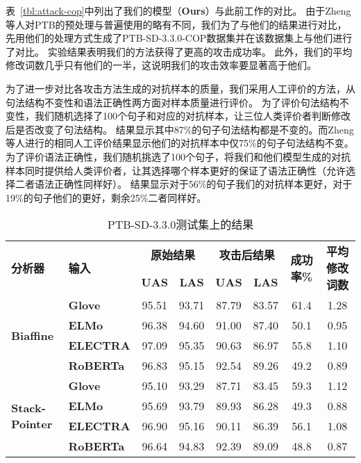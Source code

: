 表~\ref{tbl:attack-cop}中列出了我们的模型（\textbf{Ours}）与此前工作的对比。
由于Zheng等人对PTB的预处理与普遍使用的略有不同，我们为了与他们的结果进行对比，先用他们的处理方式生成了PTB-SD-3.3.0-COP数据集并在该数据集上与他们进行了对比。
实验结果表明我们的方法获得了更高的攻击成功率。
此外，我们的平均修改词数几乎只有他们的一半，这说明我们的攻击效率要显著高于他们。

为了进一步对比各攻击方法生成的对抗样本的质量，我们采用人工评价的方法，从句法结构不变性和语法正确性两方面对样本质量进行评价。
为了评价句法结构不变性，我们随机选择了100个句子和对应的对抗样本，让三位人类评价者判断修改后是否改变了句法结构。
结果显示其中87\%的句子句法结构都是不变的。而Zheng等人进行的相同人工评价结果显示他们的对抗样本中仅75\%的句子句法结构不变。
为了评价语法正确性，我们随机挑选了100个句子，将我们和他们模型生成的对抗样本同时提供给人类评价者，让其选择哪个样本更好的保证了语法正确性（允许选择二者语法正确性同样好）。
结果显示对于56\%的句子我们的对抗样本更好，对于19\%的句子他们的更好，剩余25\%二者同样好。

\begin{table}[htbp]
	\centering
	\small
	\renewcommand{\arraystretch}{1.2}
	\begin{tabular}{l|l||cc|cc|c|c}
		\hline
		\multirow{2}{*}{\bf 分析器}&\multirow{2}{*}{\bf 输入}& \multicolumn{2}{c|}{\bf 原始结果} & \multicolumn{2}{c|}{\bf 攻击后结果} & \multirow{2}{*}{\bf 成功率\%} & \multirow{2}{*}{\bf 平均修改词数} \\
		\cline{3-6}
		& & \bf UAS & \bf LAS & \bf UAS & \bf LAS & & \\
		\hline
		\multirow{4}{*}{\bf Biaffine} & \bf Glove &95.51 & 93.71 &87.79 &83.57 &61.4 &1.28 \\
		& \bf ELMo  &96.38 &94.60 &91.00 &87.40 &50.1 &0.95 \\
		& \bf ELECTRA &97.09 & 95.35 &90.63 &86.97 &55.8 &1.10 \\
		& \bf RoBERTa &96.83 & 95.15 &92.54 &89.26 &49.2 &0.89 \\
		\hline
		\hline
		\multirow{4}{*}{\bf Stack-Pointer} & \bf Glove &95.10 & 93.29 &87.71 &83.45 &59.3 &1.12 \\
		& \bf ELMo    &95.69 & 93.79 &89.93 &86.28 &49.3 &0.88 \\
		& \bf ELECTRA &96.90 & 95.16 &90.11 &86.39 &56.1 &1.08 \\
		& \bf RoBERTa &96.64 & 94.83 &92.39 &89.09 &48.8 &0.87 \\
		\hline
	\end{tabular}
	\caption{PTB-SD-3.3.0测试集上的结果} 
	\label{tbl:attack-main}
\end{table}

